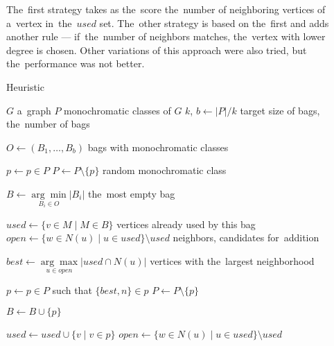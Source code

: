 The~first strategy \Neighbors{} takes as the~score the~number of
neighboring vertices of a~vertex in~the~$used$ set.
The~other strategy \NeighborsDegree{} is based
on the~first and adds another rule ---
if~the~number of neighbors matches, the~vertex with lower degree is chosen.
%
Other variations of this approach were also tried,
but the~performance was not better.


\begin{algorithm}[ht]
	\caption{Heuristic \Neighbors}%
	\label{alg:neighbors}
	\begin{algorithmic}[1]

		\Require{} $G$
		\Comment{} a~graph
		\Require{} $P$
		\Comment{} monochromatic classes of $G$
		\Require{} $k$, $b \gets |P|/k$
		\Comment{} target size of bags, the~number of bags

		\Ensure{} $O \gets (B_1, \ldots, B_b)$
		\Comment{} bags with monochromatic classes

		\State{} $p \gets p \in P$
		\State{} $P \gets P \setminus \{p\}$
		\Comment{} random monochromatic class

		\State{} $B \gets \underset{B_i \in O}{\arg\min} |B_i|$
		\Comment{} the~most empty bag

		\State{} $used \gets \{{v \in M} \mid {M \in B } \}$
		\Comment{} vertices already used by this bag
		\State{} $open \gets  \{w \in N(u) \mid u \in used\} \setminus used $
		\Comment{} neighbors, candidates for~addition


		\State{} $best \gets \underset{u \in open}{\arg\max}|used \cap N(u)|$
		\Comment{} vertices with the~largest neighborhood

		\State{} $p \gets p \in P$ such that $\{best, n\} \in p$
		\State{} $P \gets P \setminus \{p\}$

		\State{} $B \gets B \cup \{p\}$

		\State{} $used \gets used \cup \{v \mid {v \in p} \}$
		\State{} $open \gets  \{w \in N(u) \mid u \in used\} \setminus used $
		\EndFor{}
		\EndWhile{}
		\EndWhile{}
	\end{algorithmic}
\end{algorithm}

\subsubsection*{\CyclesMatchChunks{}}

